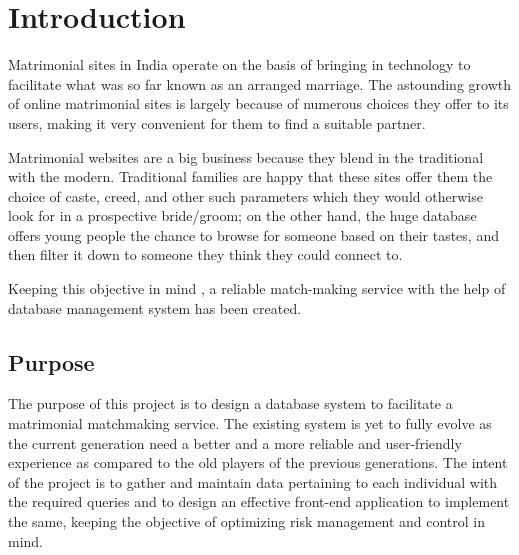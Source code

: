 \documentclass[12pt]{report}
\begin{document}
\tableofcontents
\listoffigures

\chapter{Introduction}\label{ch:introduction}
Matrimonial sites in India operate on the basis of bringing in technology to facilitate what was so far known as an arranged marriage. The astounding growth of online matrimonial sites is largely because of numerous choices they offer to its users, making it very convenient for them to find a suitable partner.

Matrimonial websites are a big business because they blend in the traditional with the modern. Traditional families are happy that these sites offer them the choice of caste, creed, and other such parameters which they would otherwise look for in a prospective bride/groom; on the other hand, the huge database offers young people the chance to browse for someone based on their tastes, and then filter it down to someone they think they could connect to.

Keeping this objective in mind , a reliable match-making service with the help of database management system has been created.




\section{Purpose}
The purpose of this project is to design a database system to facilitate a matrimonial matchmaking service. The existing system is yet to fully evolve as the current generation need a better and a more reliable and user-friendly experience as compared to the old players of the previous generations. 
The intent of the project is to gather and maintain data pertaining to each individual with the required queries and to design an effective front-end application to implement the same, keeping the objective of optimizing risk management and control in mind. 
\end{document}
